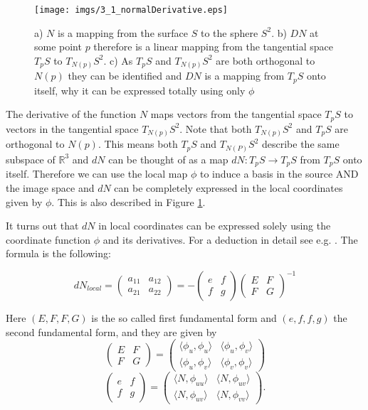 \begin{figure}[ht]
\begin{center}
\texttt{[image: imgs/3\_1\_normalDerivative.eps]}
\end{center}
\caption{a) $N$ is a mapping from the surface $S$ to the sphere $S^2$. b) $DN$ at some point $p$ therefore is a linear mapping from the tangential space $T_pS$ to $T_{N(p)}S^2$. c) As $T_pS$ and $T_{N(p)}S^2$ are both orthogonal to $N(p)$ they can be identified and $DN$ is a mapping from $T_p S$ onto itself, why it can be expressed totally using only $\phi$}
\label{fig::3_1_normalDerivative}
\end{figure}

The derivative of the function $N$ maps vectors from the tangential space $T_pS$ to vectors in the tangential space $T_{N(p)}S^2$. Note that both $T_{N(p)}S^2$ and $T_pS$ are orthogonal to $N(p)$. This means both $T_pS$ and $T_{N(P)}S^2$ describe the same subspace of $\mathbb R^3$ and $dN$ can be thought of as a map $dN: T_pS \rightarrow T_pS$ from $T_pS$ onto itself. Therefore we can use the local map $\phi$ to induce a basis in the source AND the image space and $dN$ can be completely expressed in the local coordinates given by $\phi$. This is also described in Figure \ref{fig::3_1_normalDerivative}.


It turns out that $dN$ in local coordinates can be expressed solely using the coordinate function $\phi$ and its derivatives. For a deduction in detail see e.g. . The formula is the following:

\[dN_{local} = \begin{pmatrix} a_{11} & a_{12} \\ a_{21} & a_{22} \end{pmatrix} = - \begin{pmatrix} e & f \\ f & g \end{pmatrix} \begin{pmatrix} E & F \\ F & G \end{pmatrix}^{-1}\]

Here $(E,F,F,G)$ is the so called first fundamental form and $(e,f,f,g)$ the second fundamental form, and they are given by
\[\begin{pmatrix} E & F \\ F & G \end{pmatrix} = \begin{pmatrix} \langle \phi_u, \phi_u \rangle & \langle \phi_u, \phi_v \rangle \\ 
							\langle \phi_u, \phi_v \rangle & \langle \phi_v, \phi_v \rangle \end{pmatrix}\]
\[\begin{pmatrix} e & f \\ f & g \end{pmatrix} = \begin{pmatrix} \langle N, \phi_{uu} \rangle & \langle N, \phi_{uv} \rangle \\ 
							\langle N, \phi_{uv} \rangle & \langle N, \phi_{vv} \rangle \end{pmatrix}.\]


